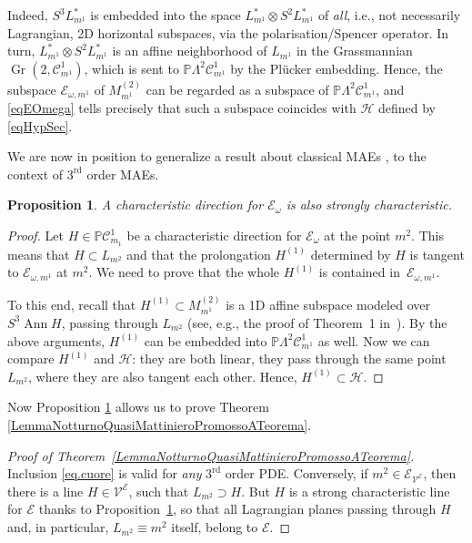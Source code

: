 \documentclass[pdftex]{sigma}
\newcommand{\C}{\mathcal{C}}
\newcommand{\M}{\mathcal{V}}
\newcommand{\E}{\mathcal{E}}
\newcommand{\Ann}{\operatorname{Ann}}
\newcommand{\Gr}{\operatorname{Gr}}
\renewcommand{\P}{\mathbb{P}}
\newcommand{\Rd}{^\textrm{rd}}
\newcommand{\elle}{H}
\numberwithin{equation}{section}
\newtheorem{Proposition}[Theorem]{Proposition}
 { \theoremstyle{definition}
\newtheorem{Definition}[Theorem]{Definition}
\newtheorem{Example}[Theorem]{Example}
\newtheorem{Remark}[Theorem]{Remark} }
\begin{document}
Indeed, $S^3L_{m^1}^\ast$ is embedded into the space $L_{m^1}^\ast\otimes S^2L_{m^1}^\ast$
 of \emph{all}, i.e., not necessarily Lagrangian, 2D horizontal subspaces, via the polarisation/Spencer operator. In turn, $L_{m^1}^\ast\otimes S^2L_{m^1}^\ast$ is an af\/f\/ine neighborhood of $L_{m^1}$ in the Grassmannian $\Gr(2,\C^1_{m^1})$, which is sent to $\P \Lambda^2\C^{1}_{m^1}$ by the Pl\"ucker embedding. Hence, the subspace $\E_{\omega, m^1}$ of $M^{(2)}_{m^1}$ can be regarded as a subspace of $\P \Lambda^2\C^{1}_{m^1}$, and \eqref{eqEOmega} tells precisely that such a subspace coincides with $\mathcal{H}$ def\/ined by \eqref{eqHypSec}.

We are now in position to generalize a result about classical MAEs \cite[Theorem 3.7]{MR2985508}, to the context of $3\Rd$ order MAEs.
\begin{Proposition}\label{proposizioneNotturna}
 A characteristic direction for $\E_\omega$ is also strongly characteristic.
\end{Proposition}
\begin{proof}
 Let $\elle\in\P\C^1_{m_1}$ be a characteristic direction for $\E_\omega$ at the point $m^2$. This means that $\elle\subset L_{m^2}$ and that the prolongation $\elle^{(1)}$ determined by $\elle$ is tangent to $\E_{\omega, m^1}$ at $m^2$. We need to prove that the whole $\elle^{(1)}$ is contained in~$\E_{\omega, m^1}$.

 To this end, recall that $\elle^{(1)}\subset M^{(2)}_{m^1}$ is a 1D af\/f\/ine subspace modeled over $S^3\Ann\elle$, passing through $L_{m^2}$ (see, e.g., the proof of Theorem~1 in~\cite{MorBach}). By the above arguments, $\elle^{(1)}$ can be embedded into $\P \Lambda^2\C^{1}_{m^1}$ as well. Now we can compare $\elle^{(1)}$ and $\mathcal{H}$: they are both linear, they pass through the same point~$L_{m^2}$, where they are also tangent each other. Hence, $\elle^{(1)}\subset \mathcal{H}$.
\end{proof}

Now Proposition \ref{proposizioneNotturna} allows us to prove Theorem \ref{LemmaNotturnoQuasiMattinieroPromossoATeorema}.

\begin{proof}[Proof of Theorem~\ref{LemmaNotturnoQuasiMattinieroPromossoATeorema}]
Inclusion \eqref{eq.cuore} is valid for \emph{any} $3\Rd$ order PDE. Conversely, if $m^2\in\E_{\M^\E}$, then there is a line $\elle\in \M^\E$, such that $L_{m^2}\supset\elle$. But
$\elle$ is a strong characteristic line for $\E$ thanks to
Proposition~\ref{proposizioneNotturna}, so that all Lagrangian planes passing through $\elle$ and, in particular, $L_{m^2}\equiv m^2$ itself, belong to $\E$.\end{proof}
\end{document}
